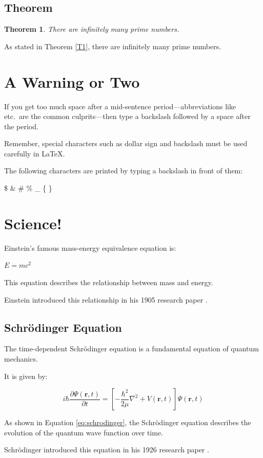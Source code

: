 \documentclass[12pt,a4paper]{article}
\newtheorem{theorem}{Theorem}[section]
\begin{document}
	\subsection{Theorem}
	
	\begin{theorem}
		There are infinitely many prime numbers.
	\end{theorem}
	
	As stated in Theorem \ref{T1}, there are infinitely many prime numbers.
	
	\section{A Warning or Two}
	
	If you get too much space after a mid-sentence period---abbreviations like etc.\ are the common culprits---then type a backslash followed by a space after the period.
	
	\noindent Remember, special characters such as dollar sign and backslash must be used carefully in LaTeX.
	
	The following characters are printed by typing a backslash in front of them:
	
	\$ \quad \& \quad \# \quad \% \quad \_ \quad \{ \quad \}
	
	\section{Science!}
	\label{intro}
	
	Einstein's famous mass-energy equivalence equation is:
	
	$E=mc^2$
	
	This equation describes the relationship between mass and energy.
	
	Einstein introduced this relationship in his 1905 research paper \citep{einstein1905}.
	
	\subsection{Schrödinger Equation}
	
	The time-dependent Schrödinger equation is a fundamental equation of quantum mechanics.
	
	It is given by:
	
	\begin{equation}
		i\hbar\frac{\partial\Psi(\mathbf{r},t)}{\partial t}
		=
		\left[
		-\frac{\hbar^2}{2\mu}\nabla^2
		+V(\mathbf{r},t)
		\right]\Psi(\mathbf{r},t)
		\label{eq:schrodinger}
	\end{equation}
	
	As shown in Equation \ref{eq:schrodinger}, the Schrödinger equation describes the evolution of the quantum wave function over time.
	
	Schrödinger introduced this equation in his 1926 research paper \citep{schrodinger1926}.
	
	\newpage
	
	
	
	
\end{document}
